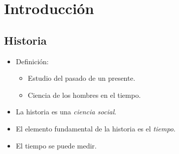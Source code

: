 \section{Introducción}

\subsection{Historia}

\begin{itemize}

\item Definición:
\begin{itemize}
	\item Estudio del pasado de un presente.
	\item Ciencia de los hombres en el tiempo.
\end{itemize}

\item La historia es una \emph{ciencia social}.

\item El elemento fundamental de la historia es el \emph{tiempo}.

\item El tiempo se puede medir.

\end{itemize}